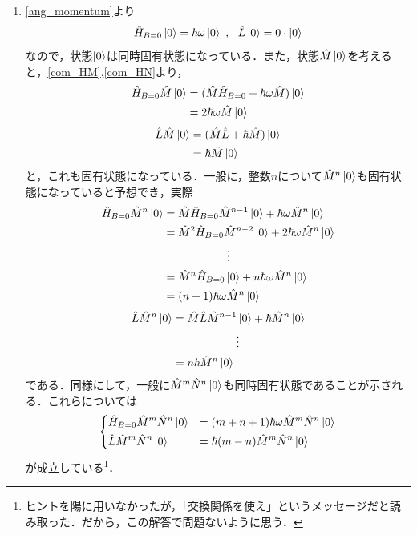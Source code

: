 \documentclass[a4paper,pdflatex,ja=standard]{bxjsarticle}
\begin{document}
\begin{enumerate}
  \item 
  \eqref{ang_momentum}より
  \begin{equation}
    \hat{H}_{B=0}\ket{0}
    =
    \hbar\omega\ket{0}
    \ ,\ \ 
    \hat{L}\ket{0}
    =
    0\cdot\ket{0}
  \end{equation}
  なので，状態$\ket{0}$は同時固有状態になっている．また，状態$\hat{M}\ket{0}$を考えると，\eqref{com_HM},\eqref{com_HN}より，
  \begin{align}
    \hat{H}_{B=0}\hat{M}\ket{0}
    &=
    (\hat{M}\hat{H}_{B=0}+\hbar\omega\hat{M})\ket{0}
    \nonumber
    \\
    &=
    2\hbar\omega\hat{M}\ket{0}
  \end{align}
  \begin{align}
    \hat{L}\hat{M}\ket{0}
    &=
    (\hat{M}\hat{L}+\hbar\hat{M})\ket{0}
    \nonumber
    \\
    &=
    \hbar\hat{M}\ket{0}
  \end{align}
  と，これも固有状態になっている．一般に，整数$n$について$\hat{M}^{n}\ket{0}$も固有状態になっていると予想でき，実際
  \begin{align}
    \hat{H}_{B=0}\hat{M}^{n}\ket{0}
    &=
    \hat{M}\hat{H}_{B=0}\hat{M}^{n-1}\ket{0}
    +
    \hbar\omega\hat{M}^{n}\ket{0}
    \nonumber
    \\
    &=
    \hat{M}^2\hat{H}_{B=0}\hat{M}^{n-2}\ket{0}
    +
    2\hbar\omega\hat{M}^{n}\ket{0}
    \nonumber
    \\
    &\hspace{2cm}\vdots
    \nonumber
    \\
    &=
    \hat{M}^{n}\hat{H}_{B=0}\ket{0}
    +
    n\hbar\omega\hat{M}^{n}\ket{0}
    \nonumber
    \\
    &=
    (n+1)\hbar\omega\hat{M}^{n}\ket{0}
  \end{align}
  \begin{align}
    \hat{L}\hat{M}^{n}\ket{0}
    &=
    \hat{M}\hat{L}\hat{M}^{n-1}\ket{0}
    +
    \hbar\hat{M}^{n}\ket{0}
    \nonumber
    \\
    &\hspace{2cm}\vdots
    \nonumber
    \\
    &=
    n\hbar\hat{M}^{n}\ket{0}
    \hspace{2cm}
  \end{align}
  である．同様にして，一般に$\hat{M}^{m}\hat{N}^{n}\ket{0}$も同時固有状態であることが示される．これらについては
  \begin{equation}
    \begin{dcases}
      \hat{H}_{B=0}\hat{M}^{m}\hat{N}^{n}\ket{0}
      &=
      (m+n+1)\hbar\omega\hat{M}^{m}\hat{N}^{n}\ket{0}
      \\
      \hat{L}\hat{M}^{m}\hat{N}^{n}\ket{0}
      &=
      \hbar(m-n)\hat{M}^{m}\hat{N}^{n}\ket{0}          
    \end{dcases}
  \end{equation}
  が成立している\footnote{ヒントを陽に用いなかったが，「交換関係を使え」というメッセージだと読み取った．だから，この解答で問題ないように思う．}．
  

\end{enumerate}
\end{document}
